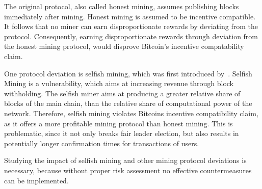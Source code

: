 The original protocol, also called honest mining, assumes publishing blocks immediately after mining. Honest mining is assumed to be incentive compatible. It follows that no miner can earn disproportionate rewards by deviating from the protocol.
Consequently, earning disproportionate rewards through deviation from the honest mining protocol, would disprove Bitcoin's incentive compatability claim.

One protocol deviation is selfish mining, which was first introduced by~\cite{eyal}.
Selfish Mining is a vulnerability, which aims at increasing revenue through block withholding. The selfish miner aims at producing a greater relative share of blocks of the main chain, than the relative share of computational power of the network. Therefore, selfish mining violates Bitcoins incentive compatibility claim, as it offers a more profitable mining protocol than honest mining. This is problematic, since it not only breaks fair leader election, but also results in potentially longer confirmation times for transactions of users.

Studying the impact of selfish mining and other mining protocol deviations is necessary, because without proper risk assessment no effective countermeasures can be implemented.


